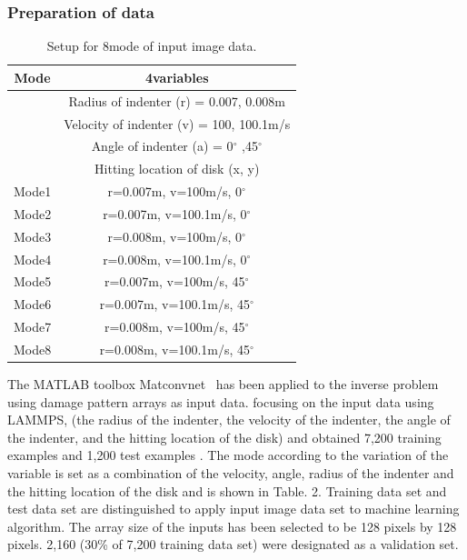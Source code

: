 \subsubsection{Preparation of data}
\label{subsubsec1}
\begin{table}[h!]
\centering
\caption{Setup for 8mode of input image data.}
\label{tab:1}       
\begin{tabular}{c|c}
\hline
\hline
Mode & 4variables \\
\hline
 & Radius of indenter (r) = 0.007, 0.008m \\
 & Velocity of indenter (v) = 100, 100.1m/s \\
 & Angle of indenter (a) = 0$^{\circ}$ ,45$^{\circ}$  \\
 & Hitting location of disk (x, y) \\
 \hline
Mode1 & r=0.007m, v=100m/s, 0$^{\circ}$ \\
Mode2 & r=0.007m, v=100.1m/s, 0$^{\circ}$ \\
Mode3 & r=0.008m, v=100m/s, 0$^{\circ}$ \\
Mode4 & r=0.008m, v=100.1m/s, 0$^{\circ}$ \\
Mode5 & r=0.007m, v=100m/s, 45$^{\circ}$ \\
Mode6 & r=0.007m, v=100.1m/s, 45$^{\circ}$ \\
Mode7 & r=0.008m, v=100m/s, 45$^{\circ}$ \\
Mode8 & r=0.008m, v=100.1m/s, 45$^{\circ}$ \\
\hline
\end{tabular}
\end{table}
The MATLAB toolbox Matconvnet~\cite{Ref22} has been applied to the inverse problem using damage pattern arrays as input data.
{} focusing on the input data using LAMMPS, {} (the radius of the indenter, the velocity of the indenter, the angle of the indenter, and the hitting location of the disk) and obtained 7,200 training examples and 1,200 test examples {}.
 The mode according to the variation of the variable is set as a combination of the velocity, angle, radius of the indenter and the hitting location of the disk and is shown in Table. 2.
 Training data set and test data set are distinguished to apply input image data set to machine learning algorithm.
 The array size of the inputs has been selected to be 128 pixels by 128 pixels. %
 2,160 (30\% of 7,200 training data set) were designated as a validation set.
 {}
 {}
 {}
